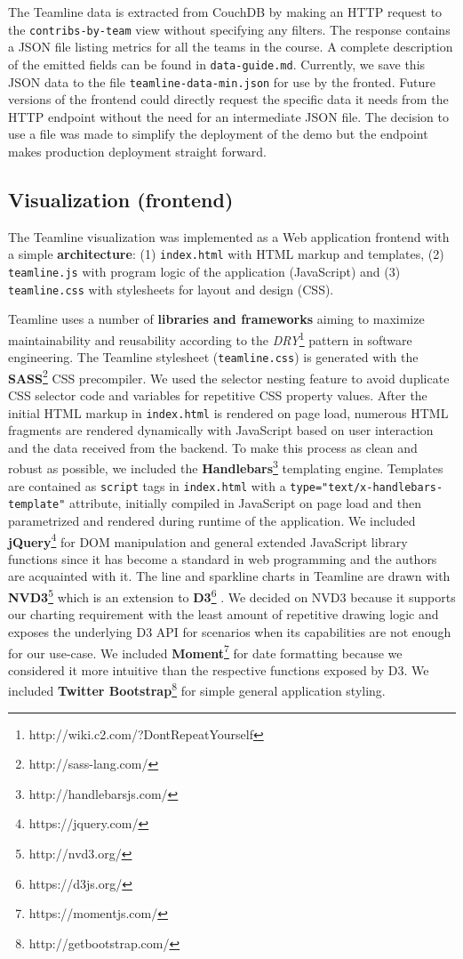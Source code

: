 \documentclass[../manifest.tex]{subfiles}
\begin{document}
The Teamline data is extracted from CouchDB by making an HTTP request to the \texttt{contribs-by-team} view without specifying any filters. The response contains a JSON file listing metrics for all the teams in the course. A complete description of the emitted fields can be found in \texttt{data-guide.md}. Currently, we save this JSON data to the file \texttt{teamline-data-min.json} for use by the fronted. Future versions of the frontend could directly request the specific data it needs from the HTTP endpoint without the need for an intermediate JSON file. The decision to use a file was made to simplify the deployment of the demo but the endpoint makes production deployment straight forward.


\subsection{Visualization (frontend)}
The Teamline visualization was implemented as a Web application frontend with a simple \textbf{architecture}: (1) \texttt{index.html} with HTML markup and templates, (2) \texttt{teamline.js} with program logic of the application (JavaScript) and (3) \texttt{teamline.css} with stylesheets for layout and design (CSS).

Teamline uses a number of \textbf{libraries and frameworks} aiming to maximize maintainability and reusability according to the \textit{DRY}\footnote{http://wiki.c2.com/?DontRepeatYourself} pattern in software engineering. The Teamline stylesheet (\texttt{teamline.css}) is generated with the \textbf{SASS}\footnote{http://sass-lang.com/} CSS precompiler. We used the selector nesting feature to avoid duplicate CSS selector code and variables for repetitive CSS property values. After the initial HTML markup in \texttt{index.html} is rendered on page load, numerous HTML fragments are rendered dynamically with JavaScript based on user interaction and the data received from the backend. To make this process as clean and robust as possible, we included the \textbf{Handlebars}\footnote{http://handlebarsjs.com/} templating engine. Templates are contained as \texttt{script} tags in \texttt{index.html} with a \texttt{type="text/x-handlebars-template"} attribute, initially compiled in JavaScript on page load and then parametrized and rendered during runtime of the application. We included \textbf{jQuery}\footnote{https://jquery.com/} for DOM manipulation and general extended JavaScript library functions since it has become a standard in web programming and the authors are acquainted with it. The line and sparkline charts in Teamline are drawn with \textbf{NVD3}\footnote{http://nvd3.org/} which is an extension to \textbf{D3}\footnote{https://d3js.org/} \cite{d3}. We decided on NVD3 because it supports our charting requirement with the least amount of repetitive drawing logic and exposes the underlying D3 API for scenarios when its capabilities are not enough for our use-case. We included \textbf{Moment}\footnote{https://momentjs.com/} for date formatting because we considered it more intuitive than the respective functions exposed by D3. We included \textbf{Twitter Bootstrap}\footnote{http://getbootstrap.com/} for simple general application styling.
\end{document}
